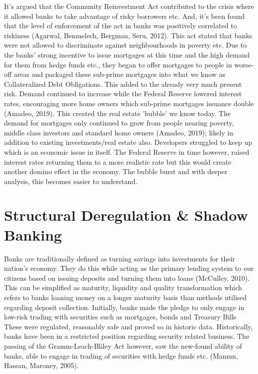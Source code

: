 \documentclass[11pt, english]{article}
\begin{document}
	It's argued that the Community Reinvestment Act contributed to the crisis where it allowed banks to take advantage of risky borrowers etc. And, it's been found that the level of enforcement of the act in banks was positively correlated to riskiness (Agarwal, Benmelech, Bergman, Seru, 2012). This act stated that banks were not allowed to discriminate against neighbourhoods in poverty etc. Due to the banks' strong incentive to issue mortgages at this time and the high demand for them from hedge funds etc., they began to offer mortgages to people in worse-off areas and packaged these sub-prime mortgages into what we know as Collateralized Debt Obligations. This added to the already very much present risk. Demand continued to increase while the Federal Reserve lowered interest rates, encouraging more home owners which sub-prime mortgages issuance double (Amadeo,  2019). This created the real estate 'bubble' we know today. The demand for mortgages only continued to grow from people nearing poverty, middle class investors and standard home owners (Amadeo, 2019); likely in addition to existing investments/real estate also. Developers struggled to keep up which is an economic issue in itself. The Federal Reserve in time however, raised interest rates returning them to a more realistic rate but this would create another domino effect in the economy. The bubble burst and with deeper analysis, this becomes easier to understand.

\newpage

\section{Structural Deregulation \& Shadow Banking}

	Banks are traditionally defined as turning savings into investments for their nation's economy. They do this while acting as the primary lending system to our citizens based on issuing deposits and turning them into loans (McCulley, 2010). This can be simplified as maturity, liquidity and quality transformation which refers to banks loaning money on a longer maturity basis than methods utilised regarding deposit collection. Initially, banks made the pledge to only engage in low-risk trading with securities such as mortgages, bonds and Treasury Bills These were regulated, reasonably safe and proved so in historic data. Historically, banks have been in a restricted position regarding security related business. The passing of the Gramm-Leach-Bliley Act however, saw the new-found ability of banks, able to engage in trading of securities with hedge funds etc. (Mamun, Hassan, Maroney, 2005).\\
\end{document}
